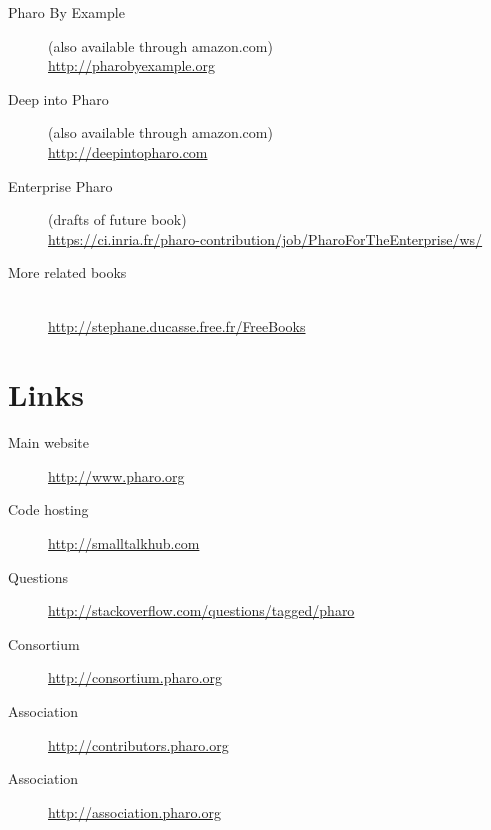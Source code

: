 \documentclass[notumble]{leaflet}
\begin{document}
\begin{description}
\item[Pharo By Example]
  (also available through amazon.com)\\
  \url{http://pharobyexample.org}
\item[Deep into Pharo]
	(also available through amazon.com)\\
  \url{http://deepintopharo.com}
\item[Enterprise Pharo]
  (drafts of future book)\\
  \url{https://ci.inria.fr/pharo-contribution/job/PharoForTheEnterprise/ws/}
\item[More related books]~\\
    \url{http://stephane.ducasse.free.fr/FreeBooks}
\end{description}



\section{Links}

\begin{description}
\item[Main website] \url{http://www.pharo.org}
\item[Code hosting] \url{http://smalltalkhub.com}
\item[Questions] \url{http://stackoverflow.com/questions/tagged/pharo}
\item[Consortium] \url{http://consortium.pharo.org}
\item[Association] \url{http://contributors.pharo.org}
\item[Association] \url{http://association.pharo.org}
\end{description}

\vfill{}
\end{document}
